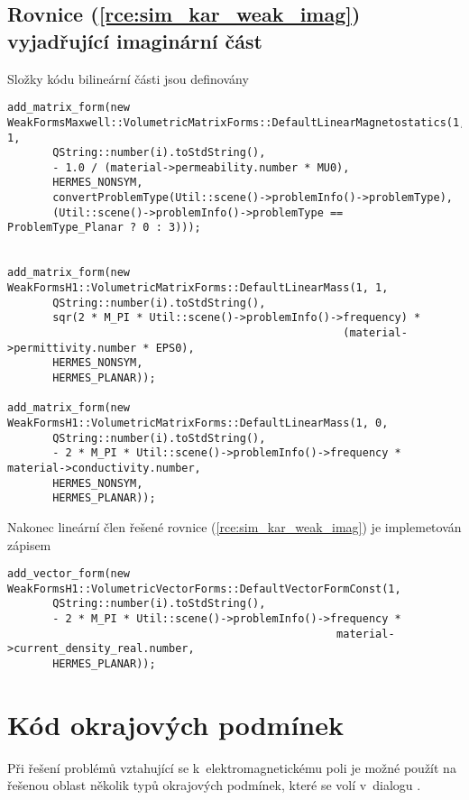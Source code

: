 \subsection*{Rovnice (\ref{rce:sim_kar_weak_imag}) vyjadřující imaginární část}
Složky kódu bilineární části jsou definovány
\begin{verbatim}
add_matrix_form(new WeakFormsMaxwell::VolumetricMatrixForms::DefaultLinearMagnetostatics(1, 1,
       QString::number(i).toStdString(),
       - 1.0 / (material->permeability.number * MU0),
       HERMES_NONSYM,
       convertProblemType(Util::scene()->problemInfo()->problemType),
       (Util::scene()->problemInfo()->problemType == ProblemType_Planar ? 0 : 3)));


add_matrix_form(new WeakFormsH1::VolumetricMatrixForms::DefaultLinearMass(1, 1,
       QString::number(i).toStdString(),
       sqr(2 * M_PI * Util::scene()->problemInfo()->frequency) *
                                                    (material->permittivity.number * EPS0),
       HERMES_NONSYM,
       HERMES_PLANAR));
       
add_matrix_form(new WeakFormsH1::VolumetricMatrixForms::DefaultLinearMass(1, 0,
       QString::number(i).toStdString(),
       - 2 * M_PI * Util::scene()->problemInfo()->frequency * material->conductivity.number,
       HERMES_NONSYM,
       HERMES_PLANAR));
\end{verbatim}
Nakonec lineární člen řešené rovnice (\ref{rce:sim_kar_weak_imag}) je implemetován zápisem
\begin{verbatim}
add_vector_form(new WeakFormsH1::VolumetricVectorForms::DefaultVectorFormConst(1,
       QString::number(i).toStdString(),
       - 2 * M_PI * Util::scene()->problemInfo()->frequency * 
                                                   material->current_density_real.number,
       HERMES_PLANAR));
\end{verbatim}

\section{Kód okrajových podmínek}
Při řešení problémů vztahující se k~elektromagnetickému poli je možné použít na řešenou oblast několik typů okrajových podmínek, které se volí v~dialogu . 

